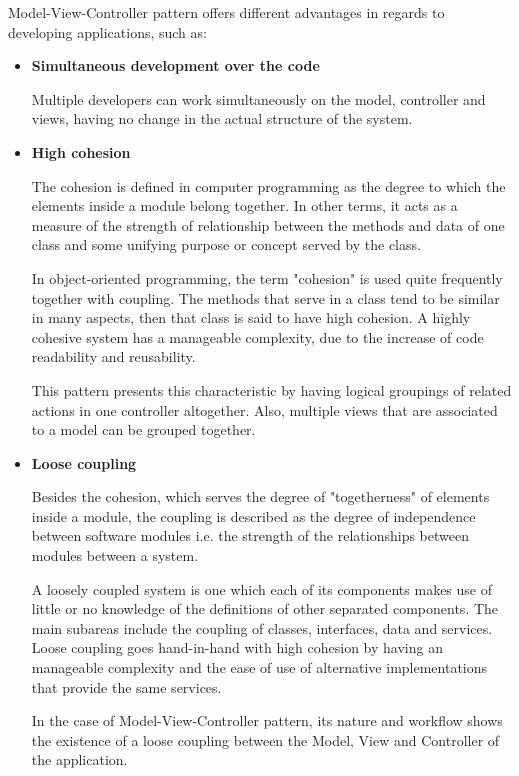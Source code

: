 \documentclass[12pt,a4paper,twoside]{report}
\begin{document}
Model-View-Controller pattern offers different advantages in regards to developing applications, such as:
\begin{itemize}
	\item \textbf{Simultaneous development over the code} 
	
	Multiple developers can work simultaneously on the model, controller and views, having no change in the actual structure of the system.
	\item \textbf{High cohesion}
			
	The cohesion is defined in computer programming as the degree to which the elements inside a module belong together. In other terms, it acts as a measure of the strength of relationship between the methods and data of one class and some unifying purpose or concept served by the class.
	
	In object-oriented programming, the term "cohesion" is used quite frequently together with coupling. The methods that serve in a class tend to be similar in many aspects, then that class is said to have high cohesion. A highly cohesive system has a manageable complexity, due to the increase of code readability and reusability. 
	
	This pattern presents this characteristic by having logical groupings of related actions in one controller altogether. Also, multiple views that are associated to a model can be grouped together. 
	
	\item \textbf{Loose coupling}
	
	Besides the cohesion, which serves the degree of "togetherness" of elements inside a module, the coupling is described as the degree of independence between software modules i.e. the strength of the relationships between modules between a system.
	
	A loosely coupled system is one which each of its components makes use of little or no knowledge of the definitions of other separated components. The main subareas include the coupling of classes, interfaces, data and services. Loose coupling goes hand-in-hand with high cohesion by having an manageable complexity and the ease of use of alternative implementations that provide the same services. 
	
	In the case of Model-View-Controller pattern, its nature and workflow shows the existence of a loose coupling between the Model, View and Controller of the application.	

\end{itemize} 
\end{document}
